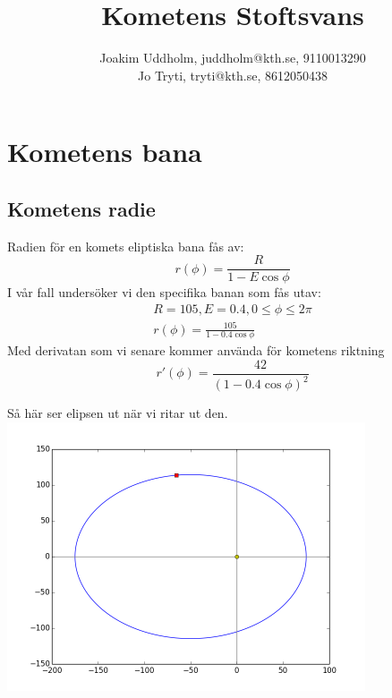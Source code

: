 \documentclass[11pt,twoside]{article}
\title{Kometens Stoftsvans}
\author{Joakim Uddholm, juddholm@kth.se, 9110013290 \\
		Jo Tryti, tryti@kth.se, 8612050438}
\date{}
\begin{document}
\maketitle
\newpage


\section{Kometens bana}

\subsection{Kometens radie}
Radien för en komets eliptiska bana fås av:
\begin{equation}
    r(\phi)=\frac{R}{1-E\cos\phi}
\end{equation}
I vår fall undersöker vi den specifika banan som fås utav:
\begin{equation}
	\begin{split}
     R = 105, E = 0.4, 0 \leq \phi \leq 2\pi \\
     r(\phi)=\frac{105}{1-0.4\cos\phi}
     \end{split}
\end{equation}
Med derivatan som vi senare kommer använda för kometens riktning
\begin{equation}
    r'(\phi)=\frac{42}{(1-0.4\cos\phi)^2}
\end{equation}

Så här ser elipsen ut när vi ritar ut den.\\
\includegraphics[width=300pt]{imgs/elipse.png}
\end{document}
